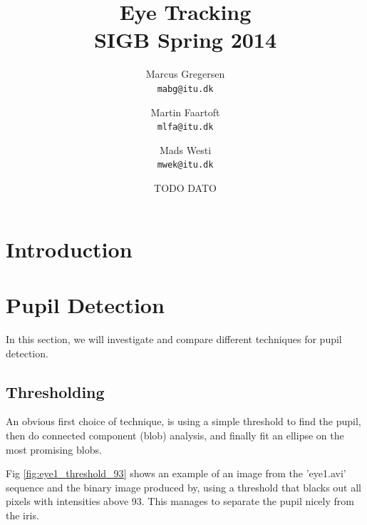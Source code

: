 \documentclass[a4paper,11pt]{article}
\begin{document}
\date{TODO DATO}
\title{Eye Tracking\\SIGB Spring 2014}

\author{Marcus Gregersen\\
\texttt{mabg@itu.dk}
\and Martin Faartoft\\
\texttt{mlfa@itu.dk}
\and Mads Westi\\
\texttt{mwek@itu.dk}}
\clearpage\maketitle
\thispagestyle{empty}
\setcounter{page}{1}
\newpage

\section{Introduction}


\section{Pupil Detection}
In this section, we will investigate and compare different techniques for pupil detection.

\subsection{Thresholding}
An obvious first choice of technique, is using a simple threshold to find the pupil, then do connected component (blob) analysis, and finally fit an ellipse on the most promising blobs.

Fig \ref{fig:eye1_threshold_93} shows an example of an image from the 'eye1.avi' sequence and the binary image produced by, using a threshold that blacks out all pixels with intensities above 93. This manages to separate the pupil nicely from the iris.
\end{document}
